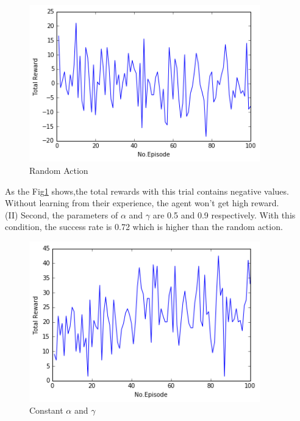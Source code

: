 \documentclass[a4paper,11pt]{article}
\begin{document}
        


\begin{figure}[H]
\begin{center}
\includegraphics[width=100mm]{graph/random.jpg}
\end{center}
\caption{Random Action}
\label{fig:one}
\end{figure}

As the Fig\ref{fig:one} shows,the total rewards with this trial contains negative values.
Without learning from their experience, the agent won't get high reward.
\\


(I\hspace{-.1em}I) Second, the parameters of $\alpha$ and $\gamma$ are 0.5 and 0.9 respectively.
With this condition, the success rate is 0.72 which is higher than the random action.

\begin{figure}[H]
\begin{center}
\includegraphics[width=100mm]{graph/constant.jpg}
\end{center}
\caption{Constant $\alpha$ and $\gamma$}
\label{fig:two}
\end{figure}
\end{document}
